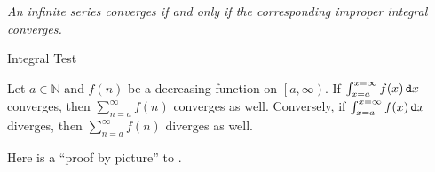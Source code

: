 \begin{center}
\emph{An infinite series converges if and only if the corresponding improper integral converges.} 
\end{center}

\begin{theorem}{Integral Test}

Let $a\in \mathbb{N}$ and $f(n)$ be a decreasing function on $\left[ a,\infty\right)$.  If $\int_{x=a}^{x=\infty} f(x) \mathop{}\!\mathtt{d} x$ converges, then $\sum_{n=a}^\infty f(n)$ converges as well.  Conversely, if $\int_{x=a}^{x=\infty} f(x) \mathop{}\!\mathtt{d} x$ diverges, then $\sum_{n=a}^\infty f(n)$ diverges as well.  

\end{theorem}

Here is a ``proof by picture'' to .

